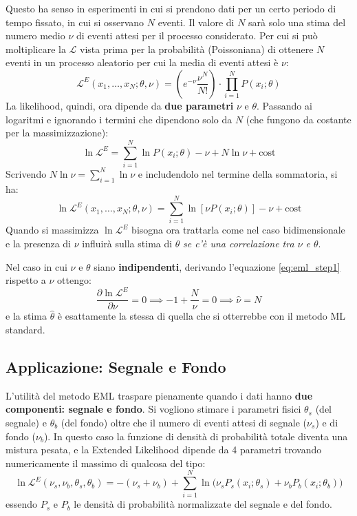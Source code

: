 \documentclass[openany,a4paper,12pt]{book}
\providecommand{\mathscr}[1]{\mathcal{#1}}
\theoremstyle{remark}
\begin{document}
Questo ha senso in esperimenti in cui si prendono dati per un certo periodo di tempo fissato, in cui si osservano $N$ eventi. Il valore di $N$ sarà solo una stima del numero medio $\nu$ di eventi attesi per il processo considerato. Per cui si può moltiplicare la $\mathscr{L}$ vista prima per la probabilità (Poissoniana) di ottenere $N$ eventi in un processo aleatorio per cui la media di eventi attesi è $\nu$:
\begin{equation}   
 \mathscr{L}^{E}(x_1, \dots, x_N ; \theta, \nu) = \left( e^{-\nu} \frac{\nu^N}{N!} \right) \cdot \prod_{i=1}^N P(x_i; \theta) 
\end{equation}
La likelihood, quindi, ora dipende da \textbf{due parametri} $\nu$ e $\theta$. Passando ai logaritmi e ignorando i termini che dipendono solo da $N$ (che fungono da costante per la massimizzazione):
\begin{equation}
    \ln \mathscr{L}^{E} = \sum_{i=1}^N \ln P(x_i; \theta) - \nu + N \ln \nu + \text{cost} 
    \label{eq:eml_step1}
\end{equation}
Scrivendo $N \ln \nu = \sum_{i=1}^N \ln \nu$ e includendolo nel termine della sommatoria, si ha:
\begin{equation}
    \ln \mathscr{L}^{E}(x_1, \dots, x_N ; \theta, \nu) = \sum_{i=1}^N \ln \left[ \nu P(x_i; \theta) \right] - \nu + \text{cost}
\end{equation}
Quando si massimizza $\ln \mathscr{L}^E$ bisogna ora trattarla come nel caso bidimensionale e la presenza di $\nu$ influirà sulla stima di $\theta$ \textit{se c'è una correlazione tra $\nu$ e $\theta$}.

Nel caso in cui $\nu$ e $\theta$ siano \textbf{indipendenti}, derivando l'equazione \eqref{eq:eml_step1} rispetto a $\nu$ ottengo:
\begin{equation}
    \frac{\partial \ln \mathscr{L}^{E}}{\partial \nu} = 0 \implies -1 + \frac{N}{\nu} = 0 \implies \hat{\nu} = N
\end{equation}
e la stima $\hat{\theta}$ è esattamente la stessa di quella che si otterrebbe con il metodo ML standard.

\subsection*{Applicazione: Segnale e Fondo}
L'utilità del metodo EML traspare pienamente quando i dati hanno \textbf{due componenti: segnale e fondo}. Si vogliono stimare i parametri fisici $\theta_s$ (del segnale) e $\theta_b$ (del fondo) oltre che il numero di eventi attesi di segnale ($\nu_s$) e di fondo ($\nu_b$). In questo caso la funzione di densità di probabilità totale diventa una mistura pesata, e la Extended Likelihood dipende da 4 parametri trovando numericamente il massimo di qualcosa del tipo:
\begin{equation}
   \ln \mathscr{L}^{E}(\nu_s, \nu_b, \theta_s, \theta_b) = -(\nu_s + \nu_b) + \sum_{i=1}^N \ln \Big( \nu_s P_s(x_i; \theta_s) + \nu_b P_b(x_i; \theta_b) \Big)
\end{equation}
essendo $P_s$ e $P_b$ le densità di probabilità normalizzate del segnale e del fondo.
\end{document}
